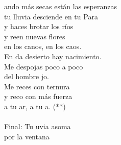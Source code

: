 \begin{cancion}%
	ando más secas están las esperanzas\\
	tu lluvia desciende en tu Para\\
	y haces brotar los ríos\\
	y reen nuevas flores\\
	en los canos, en los caos.\\
	En da desierto hay nacimiento.\\
Me despojas poco a poco \\
	del hombre jo.\\
	Me reces con ternura\\
	y reco con más fuerza\\
	a tu ar, a tu a. (**)\\
\jump\\
	Final: Tu uvia asoma\\
       por la ventana\\
\end{cancion}%
